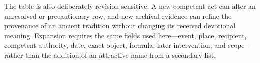 The table is also deliberately revision-sensitive. A new competent act can alter an unresolved or precautionary row, and new archival evidence can refine the provenance of an ancient tradition without changing its received devotional meaning. Expansion requires the same fields used here---event, place, recipient, competent authority, date, exact object, formula, later intervention, and scope---rather than the addition of an attractive name from a secondary list.
